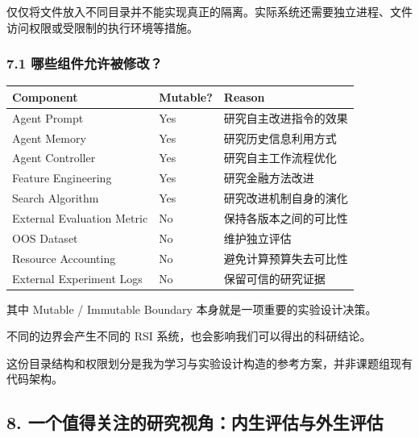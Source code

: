 仅仅将文件放入不同目录并不能实现真正的隔离。实际系统还需要独立进程、文件访问权限或受限制的执行环境等措施。

\hypertarget{part-3-31-0001-ux54eaux4e9bux7ec4ux4ef6ux5141ux8bb8ux88abux4feeux6539}{%
\subsubsection{7.1 哪些组件允许被修改？}\label{part-3-31-0001-ux54eaux4e9bux7ec4ux4ef6ux5141ux8bb8ux88abux4feeux6539}}

\begin{readertable}
\begin{longtable}[]{@{}
  >{\raggedright\arraybackslash}p{}
  >{\raggedright\arraybackslash}p{}
  >{\raggedright\arraybackslash}p{}@{}}
\toprule
Component & Mutable? & Reason \\
\midrule
\endhead
Agent Prompt & Yes & 研究自主改进指令的效果 \\
Agent Memory & Yes & 研究历史信息利用方式 \\
Agent Controller & Yes & 研究自主工作流程优化 \\
Feature Engineering & Yes & 研究金融方法改进 \\
Search Algorithm & Yes & 研究改进机制自身的演化 \\
External Evaluation Metric & No & 保持各版本之间的可比性 \\
OOS Dataset & No & 维护独立评估 \\
Resource Accounting & No & 避免计算预算失去可比性 \\
External Experiment Logs & No & 保留可信的研究证据 \\
\bottomrule
\end{longtable}
\end{readertable}

其中 Mutable / Immutable Boundary 本身就是一项重要的实验设计决策。

不同的边界会产生不同的 RSI 系统，也会影响我们可以得出的科研结论。

这份目录结构和权限划分是我为学习与实验设计构造的参考方案，并非课题组现有代码架构。

\hypertarget{part-3-31-0001-ux4e00ux4e2aux503cux5f97ux5173ux6ce8ux7684ux7814ux7a76ux89c6ux89d2ux5185ux751fux8bc4ux4f30ux4e0eux5916ux751fux8bc4ux4f30}{%
\subsection{8. 一个值得关注的研究视角：内生评估与外生评估}\label{part-3-31-0001-ux4e00ux4e2aux503cux5f97ux5173ux6ce8ux7684ux7814ux7a76ux89c6ux89d2ux5185ux751fux8bc4ux4f30ux4e0eux5916ux751fux8bc4ux4f30}}


